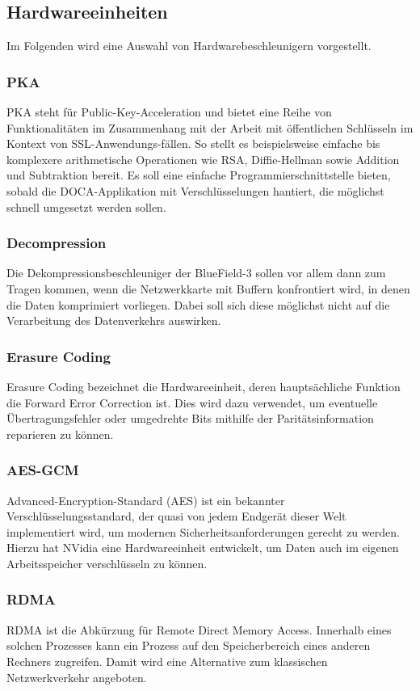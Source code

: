\subsection{Hardwareeinheiten}
Im Folgenden wird eine Auswahl von Hardwarebeschleunigern vorgestellt.
\subsubsection{PKA}
PKA steht für Public-Key-Acceleration und bietet eine Reihe von Funktionalitäten im Zusammenhang mit der Arbeit mit öffentlichen Schlüsseln im Kontext von SSL-Anwendungs-fällen. So stellt es beispielsweise einfache bis komplexere arithmetische Operationen wie RSA, Diffie-Hellman sowie Addition und Subtraktion bereit. Es soll eine einfache Programmierschnittstelle bieten, sobald die DOCA-Applikation mit Verschlüsselungen hantiert, die möglichst schnell umgesetzt werden sollen.
\subsubsection{Decompression}
Die Dekompressionsbeschleuniger der BlueField-3 sollen vor allem dann zum Tragen kommen, wenn die Netzwerkkarte mit Buffern konfrontiert wird, in denen die Daten komprimiert vorliegen. Dabei soll sich diese möglichst nicht auf die Verarbeitung des Datenverkehrs auswirken.
\subsubsection{Erasure Coding}
Erasure Coding bezeichnet die Hardwareeinheit, deren hauptsächliche Funktion die Forward Error Correction ist. Dies wird dazu verwendet, um eventuelle Übertragungsfehler oder umgedrehte Bits mithilfe der Paritätsinformation reparieren zu können.
\subsubsection{AES-GCM}
Advanced-Encryption-Standard (AES) ist ein bekannter Verschlüsselungsstandard, der quasi von jedem Endgerät dieser Welt implementiert wird, um modernen Sicherheitsanforderungen gerecht zu werden. Hierzu hat NVidia eine Hardwareeinheit entwickelt, um Daten auch im eigenen Arbeitsspeicher verschlüsseln zu können.
\subsubsection{RDMA}
RDMA ist die Abkürzung für Remote Direct Memory Access. Innerhalb eines solchen Prozesses kann ein Prozess auf den Speicherbereich eines anderen Rechners zugreifen. Damit wird eine Alternative zum klassischen Netzwerkverkehr angeboten.
